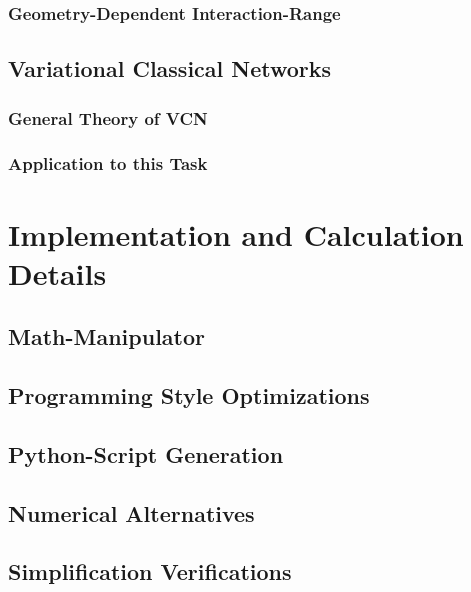 \documentclass[
headings=optiontohead,              %
12pt,                               %
DIV=13,                             %
twoside=false,                      %
open=right,                         %
BCOR=00mm,                          %
toc=bibliographynumbered            %
]{scrreport}
\begin{document}
        \subsection{Geometry-Dependent Interaction-Range}
        \label{sec:theory-optimizations-geometry}
        
        \FloatBarrier

    \section{Variational Classical Networks}

        \subsection{General Theory of VCN}

        \subsection{Application to this Task}
        

\chapter{Implementation and Calculation Details}
\label{sec:implementation-details}

\FloatBarrier

    \section{Math-Manipulator}

    \section{Programming Style Optimizations}

    \section{Python-Script Generation}

    \section{Numerical Alternatives}

    \section{Simplification Verifications}
\end{document}
